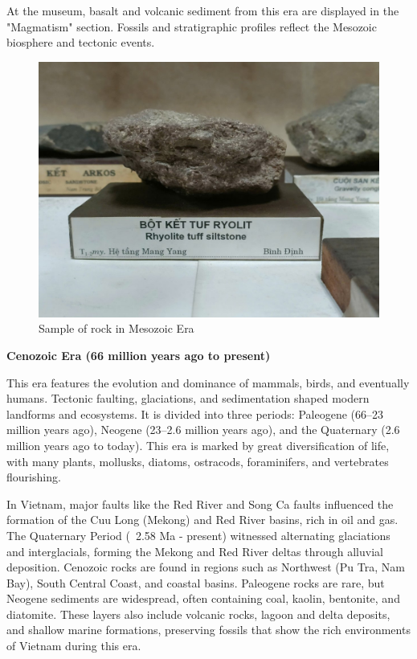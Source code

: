 At the museum, basalt and volcanic sediment from this era are displayed in the "Magmatism" section. Fossils and stratigraphic profiles reflect the Mesozoic biosphere and tectonic events.

\begin{figure}[H]
  \centering
  \includegraphics[max width=0.8\linewidth]{graphics/figure_05.jpg}
  \caption{Sample of rock in Mesozoic Era}
  \label{fig:mesozoic-rock}
\end{figure}

\textbf{Cenozoic Era (66 million years ago to present)}

This era features the evolution and dominance of mammals, birds, and eventually humans. Tectonic faulting, glaciations, and sedimentation shaped modern landforms and ecosystems. It is divided into three periods: Paleogene (66–23 million years ago), Neogene (23–2.6 million years ago), and the Quaternary (2.6 million years ago to today). This era is marked by great diversification of life, with many plants, mollusks, diatoms, ostracods, foraminifers, and vertebrates flourishing.

In Vietnam, major faults like the Red River and Song Ca faults influenced the formation of the Cuu Long (Mekong) and Red River basins, rich in oil and gas. The Quaternary Period (~2.58 Ma - present) witnessed alternating glaciations and interglacials, forming the Mekong and Red River deltas through alluvial deposition. Cenozoic rocks are found in regions such as Northwest (Pu Tra, Nam Bay), South Central Coast, and coastal basins. Paleogene rocks are rare, but Neogene sediments are widespread, often containing coal, kaolin, bentonite, and diatomite. These layers also include volcanic rocks, lagoon and delta deposits, and shallow marine formations, preserving fossils that show the rich environments of Vietnam during this era.

